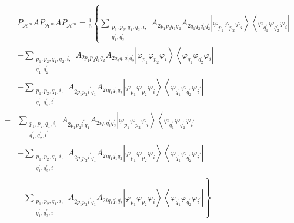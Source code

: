 \documentclass[aps,preprint]{revtex4}%
\begin{document}
\begin{align}
&  P_{\mathcal{H}^{m}}AP_{\mathcal{H}^{m}}AP_{\mathcal{H}^{m}}=\frac{1}%
{6}\left\{  \sum_{\substack{p_{1},p_{2},q_{1},q_{2},i,\\q_{1}^{\prime}%
,q_{2}^{\prime}}}A_{2p_{1}p_{2}q_{1}q_{2}}A_{2q_{1}q_{2}q_{1}^{\prime}%
q_{2}^{\prime}}\left\vert \varphi_{p_{1}}\varphi_{p_{2}}\varphi_{i}%
\right\rangle \left\langle \varphi_{q_{1}^{\prime}}\varphi_{q_{2}^{\prime}%
}\varphi_{i}\right\vert \right.  \nonumber\\
&  -\sum_{\substack{p_{1},p_{2},q_{1},q_{2},i,\\q_{1}^{\prime},q_{2}^{\prime}%
}}A_{2p_{1}p_{2}q_{1}q_{2}}A_{2q_{2}q_{1}q_{1}^{\prime}q_{2}^{\prime}%
}\left\vert \varphi_{p_{1}}\varphi_{p_{2}}\varphi_{i}\right\rangle
\left\langle \varphi_{q_{1}^{\prime}}\varphi_{q_{2}^{\prime}}\varphi
_{i}\right\vert \\
&  -\sum_{\substack{p_{1},p_{2},q_{1},i,\\q_{1}^{\prime},q_{2}^{\prime
},i^{\prime}}}A_{2p_{1}p_{2}i^{\prime}q_{1}}A_{2iq_{1}q_{1}^{\prime}%
q_{2}^{\prime}}\left\vert \varphi_{p_{1}}\varphi_{p_{2}}\varphi_{i}%
\right\rangle \left\langle \varphi_{q_{1}^{\prime}}\varphi_{q_{2}^{\prime}%
}\varphi_{i^{\prime}}\right\vert \\
- &  \sum_{\substack{p_{1},p_{2},q_{1},i,\\q_{1}^{\prime},q_{2}^{\prime
},i^{\prime}}}A_{2p_{1}p_{2}i^{\prime}q_{1}}A_{2iq_{1}q_{1}^{\prime}%
q_{2}^{\prime}}\left\vert \varphi_{p_{1}}\varphi_{p_{2}}\varphi_{i}%
\right\rangle \left\langle \varphi_{q_{1}^{\prime}}\varphi_{q_{2}^{\prime}%
}\varphi_{i^{\prime}}\right\vert \\
&  -\sum_{\substack{p_{1},p_{2},q_{1},i,\\q_{1}^{\prime},q_{2}^{\prime
},i^{\prime}}}A_{2p_{1}p_{2}i^{\prime}q_{1}}A_{2iq_{1}q_{1}^{\prime}%
q_{2}^{\prime}}\left\vert \varphi_{p_{1}}\varphi_{p_{2}}\varphi_{i}%
\right\rangle \left\langle \varphi_{q_{1}^{\prime}}\varphi_{q_{2}^{\prime}%
}\varphi_{i^{\prime}}\right\vert \\
&  \left.  -\sum_{\substack{p_{1},p_{2},q_{1},i,\\q_{1}^{\prime},q_{2}%
^{\prime},i^{\prime}}}A_{2p_{1}p_{2}i^{\prime}q_{1}}A_{2iq_{1}q_{1}^{\prime
}q_{2}^{\prime}}\left\vert \varphi_{p_{1}}\varphi_{p_{2}}\varphi
_{i}\right\rangle \left\langle \varphi_{q_{1}^{\prime}}\varphi_{q_{2}^{\prime
}}\varphi_{i^{\prime}}\right\vert \right\}
\end{align}%
\end{document}
